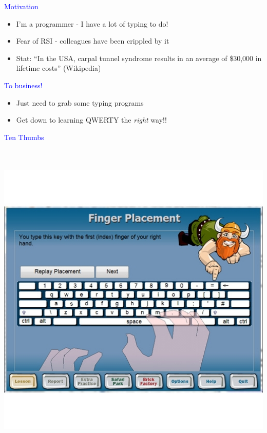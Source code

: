 \documentclass[landscape]{slides}
\begin{document}
\begin{slide}

    \textcolor{blue}{\Large{Motivation}}

    \begin{itemize}
        \item I'm a programmer - I have a lot of typing to do!
        \item Fear of RSI - colleagues have been crippled by it
        \item Stat: ``In the USA, carpal tunnel syndrome results in an average of \$30,000 in lifetime costs'' (Wikipedia)
    \end{itemize}

\end{slide}


\begin{slide}

    \textcolor{blue}{\Large{To business!}}

    \begin{itemize}
        \item Just need to grab some typing programs
        \item Get down to learning QWERTY the \emph{right} way!!
    \end{itemize}

\end{slide}


\begin{slide}

    \textcolor{blue}{\Large{Ten Thumbs}}

    \centering

    \includegraphics[height=15.5cm]{ten-thumbs}

\end{slide}
\end{document}
